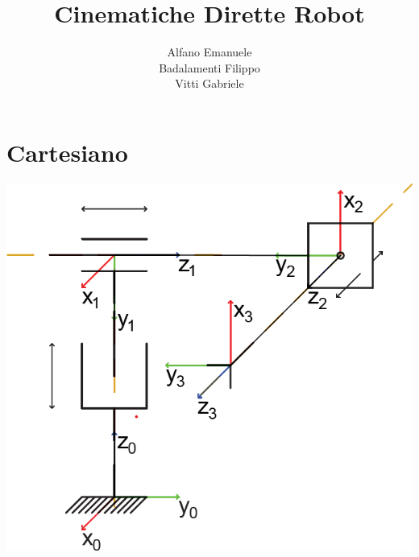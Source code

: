\documentclass[a4paper,11pt]{article}
\author{Alfano Emanuele \\ Badalamenti Filippo \\ Vitti Gabriele}
\begin{document}
\title{Cinematiche Dirette Robot}
\maketitle
\pagebreak

\section*{Cartesiano}
\includegraphics{Sorgenti/Strutture/Cartesiano.png}

\end{document}
